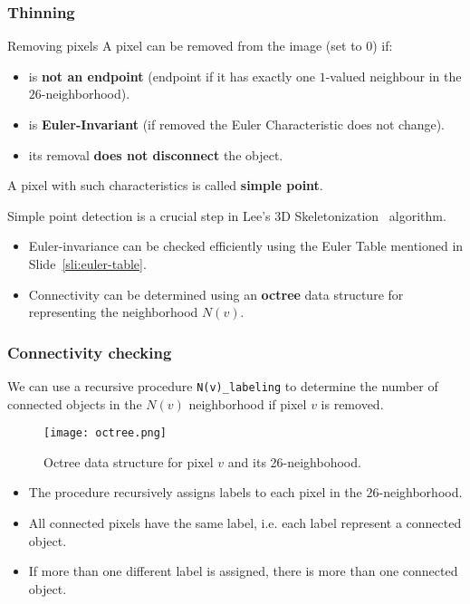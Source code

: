 \begin{frame}
  \frametitle{Thinning}
  \begin{block}{Removing pixels}
    A pixel can be removed from the image (set to 0) if:
    \begin{itemize}
      \item is \textbf{not an endpoint} (endpoint if it has exactly one $1$-valued neighbour in the $26$-neighborhood).
      \item is \textbf{Euler-Invariant} (if removed the Euler Characteristic does not change).
      \item its removal \textbf{does not disconnect} the object.
    \end{itemize}
    A pixel with such characteristics is called \textbf{simple point}.
  \end{block}
  Simple point detection is a crucial step in Lee's 3D Skeletonization~\cite{lee94} algorithm.
  \begin{itemize}
    \item Euler-invariance can be checked efficiently using the Euler Table mentioned in Slide~\vref{sli:euler-table}.
    \item Connectivity can be determined using an \textbf{octree} data structure for representing the neighborhood $N(v)$.
  \end{itemize}
\end{frame}

\begin{frame}
  \frametitle{Connectivity checking}
  We can use a recursive procedure \lstinline{N(v)_labeling} to determine the number of connected objects in the $N(v)$ neighborhood if pixel $v$ is removed.
  \begin{figure}
    \centering
    \texttt{[image: octree.png]}
    \caption{Octree data structure for pixel $v$ and its 26-neighbohood.}
  \end{figure}
  \begin{itemize}
    \item The procedure recursively assigns labels to each pixel in the $26$-neighborhood.
    \item All connected pixels have the same label, i.e. each label represent a connected object.
    \item If more than one different label is assigned, there is more than one connected object.
  \end{itemize}
\end{frame}

